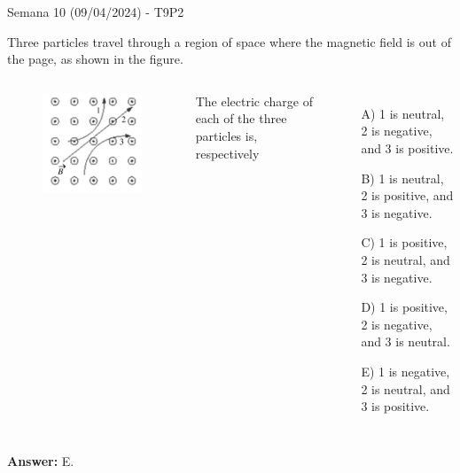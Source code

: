 \begin{frame}{Semana 10 (09/04/2024) - T9P2}
    
    Three particles travel through a region of space where the magnetic field is out of the page, as shown in the figure.
    
    \begin{columns}
        \begin{figure}
        \centering
        \includegraphics[scale=0.3]{figures/t9p2.png}
    \end{figure}
    
    The electric charge of each of the three particles is, respectively
    \begin{itemize}
       \item[A)] 1 is neutral, 2 is negative, and 3 is positive.
       \item[B)] 1 is neutral, 2 is positive, and 3 is negative.
       \item[C)] 1 is positive, 2 is neutral, and 3 is negative.
       \item[D)] 1 is positive, 2 is negative, and 3 is neutral.
       \item[E)] 1 is negative, 2 is neutral, and 3 is positive.
   \end{itemize}
    \end{columns}
    \pause \centering \textbf{Answer:} E.
    
\end{frame}


